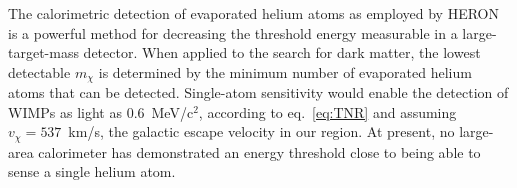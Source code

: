 \documentclass[10pt, letterpaper, reprint, superscriptaddress, aps, prl]
{revtex4-1} \usepackage[latin1]{inputenc}
\begin{document}
The calorimetric detection of evaporated helium atoms as employed by HERON is a powerful method for decreasing the threshold energy measurable in a large-target-mass detector. 
When applied to the search for dark matter, the lowest detectable $m_\chi$ is determined by the minimum number of evaporated helium atoms that can be detected. 
Single-atom sensitivity would enable the detection of WIMPs as light as 0.6~MeV/c$^2$, according to eq.~\ref{eq:TNR} and assuming $v_\chi=537$~km/s, the galactic escape velocity in our region. 
At present, no large-area calorimeter has demonstrated an energy threshold close to being able to sense a single helium atom. 



\end{document}
